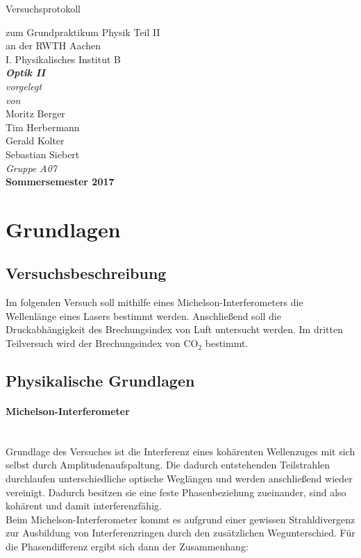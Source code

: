 \documentclass[12pt,a4paper]{article}
\author{Tim}
\begin{document}
\setlength{\parindent}{0pt} 
\begin{center}
{\LARGE Versuchsprotokoll}\\
\begin{large}
zum Grundpraktikum Physik Teil II\\[0.4cm]
an der RWTH Aachen\\
I. Physikalisches Institut B\\[4.5cm]
\Large\textbf{\textsl{Optik II}}\\[4cm]
\normalsize\textit{vorgelegt\\von}\\[0.4cm]
\large{Moritz Berger\\Tim Herbermann\\Gerald Kolter\\Sebastian Siebert}\\[1cm]
\large \textit{Gruppe A07} \\ [3cm]
\large \textbf{Sommersemester 2017}
\end{large}
\end{center}
\newpage

\tableofcontents
\newpage

\section{Grundlagen}

\subsection{Versuchsbeschreibung}
Im folgenden Versuch soll mithilfe eines Michelson-Interferometers die Wellenlänge eines Lasers bestimmt werden. Anschließend soll die Druckabhängigkeit des Brechungsindex von Luft untersucht werden. Im dritten Teilversuch wird der Brechungsindex von $\text{CO}_2$ bestimmt.\\

\subsection{Physikalische Grundlagen}

\paragraph{Michelson-Interferometer}\mbox{}\\
Grundlage des Versuches ist  die Interferenz eines kohärenten Wellenzuges mit sich selbst durch Amplitudenaufspaltung. Die dadurch entstehenden Teilstrahlen durchlaufen unterschiedliche optische Weglängen und werden anschließend wieder vereinigt. Dadurch besitzen sie eine feste Phasenbeziehung zueinander,  sind also kohärent und damit interferenzfähig.\\
Beim Michelson-Interferometer kommt es aufgrund einer gewissen Strahldivergenz zur Ausbildung von Interferenzringen durch den zusätzlichen Wegunterschied. Für die Phasendifferenz ergibt sich dann der Zusammenhang:
 
\end{document}
